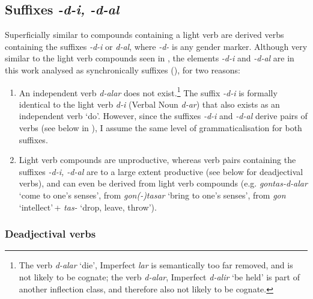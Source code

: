 \subsection{Suffixes \textit{-d-i, -d-al}} \label{didal}

Superficially similar to compounds containing a light verb are derived verbs containing the suffixes \textit{-d-i} or \textit{d-al}, where \textit{-d-} is any gender marker. Although very similar to the light verb compounds seen in , the elements \textit{-d-i} and \textit{-d-al} are in this work analysed as synchronically suffixes (\cites[185]{holiskygagua,harris09}), for two reasons: 

\begin{enumerate}
\item An independent verb \textit{d-alar} does not exist.\footnote{The verb \textit{d-alar} `die', Imperfect \textit{lar} is semantically too far removed, and is not likely to be cognate; the verb \textit{d-alar}, Imperfect \textit{d-alir} `be held' is part of another inflection class, and therefore also not likely to be cognate.} The suffix \textit{-d-i} is formally identical to the light verb \textit{d-i} (Verbal Noun \textit{d-ar}) that also exists as an independent verb `do'. However, since the suffixes \textit{-d-i} and \textit{-d-al} derive pairs of verbs (see below in ), I assume the same level of grammaticalisation for both suffixes.

\item Light verb compounds are unproductive, whereas verb pairs containing the suffixes \textit{-d-i, -d-al} are to a large extent productive (see below for deadjectival verbs), and can even be derived from light verb compounds (e.g. \textit{gontas-d-alar} `come to one's senses', from \textit{gon(-)tasar} `bring to one's senses', from \textit{gon} `intellect'\,+ \textit{tas-} `drop, leave, throw').
\end{enumerate}

\subsubsection{Deadjectival verbs} \label{deadjverb}

